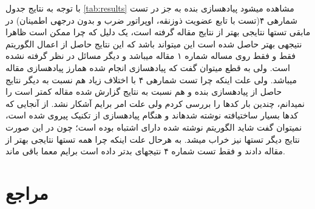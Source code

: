\documentclass[10pt,a4paper]{article}
\newcommand{\نیمفاصله}{\halfspace}
\renewcommand{\ }{\halfspace}
\newcommand{\renderref}[1] { \begingroup \let\clearpage\relax  \endgroup }
\begin{document}
\newpage
\قسمت{جمع\ بندی و نتیجه\ گیری}
با توجه به نتایج جدول
\ref{tab:results}
مشاهده می\ شود پیاده\ سازی بنده به جز در تست شماره\ ی ۴(تست با تابع عضویت ذوزنقه، اوپراتور ضرب و بدون درجه\ ی اطمینان) در مابقی تست\ ها نتایجی بهتر از نتایج مقاله گرفته است، یک دلیل که چرا ممکن است ظاهرا نتیجه\ ی بهتر حاصل شده است این می\ تواند باشد که این نتایج حاصل از اعمال الگوریتم فقط و فقط روی مساله شماره ۱ مقاله می\ باشد و دیگر مسائل در نظر گرفته نشده است. ولی به قطع میتوان گفت که پیاده\ سازی انجام شده هم\ ارز پیاده\ سازی مقاله می\ باشد. ولی علت اینکه چرا تست شماره\ ی ۴ با اختلاف زیاد هم نسبت به دیگر نتایج حاصل از پیاده\ سازی بنده و هم نسبت به نتایج گزارش شده مقاله کمتر است را نمیدانم، چندین بار کدها را بررسی کردم ولی علت امر برایم آشکار نشد. از آنجایی که کدها بسیار ساخت\ یافته نوشته شده\ اند و هنگام پیاده\ سازی از تکنیک
پیروی شده است، نمی\ توان گفت شاید الگوریتم نوشته شده دارای اشتباه بوده است؛ چون در این صورت نتایج دیگر تست\ ها نیز خراب می\ شد. به هرحال علت اینکه چرا همه تست\ ها نتایجی بهتر از مقاله دادند و فقط تست شماره ۴ نتیجه\ ای بدتر داده است برایم معما باقی ماند.
\section{مراجع}
\renderref{reference}
\end{document}

